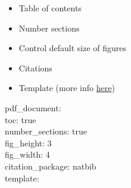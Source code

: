 \documentclass[
]{article}
\providecommand{\tightlist}{%
  \setlength{\itemsep}{0pt}\setlength{\parskip}{0pt}}
\begin{document}
\begin{itemize}
\tightlist
\item
  Table of contents
\item
  Number sections
\item
  Control default size of figures
\item
  Citations
\item
  Template (more info
  \href{http://jianghao.wang/post/2017-12-08-rmarkdown-templates/}{here})
\end{itemize}

pdf\_document:\\
toc: true\\
number\_sections: true\\
fig\_height: 3\\
fig\_width: 4\\
citation\_package: natbib\\
template:
\end{document}
